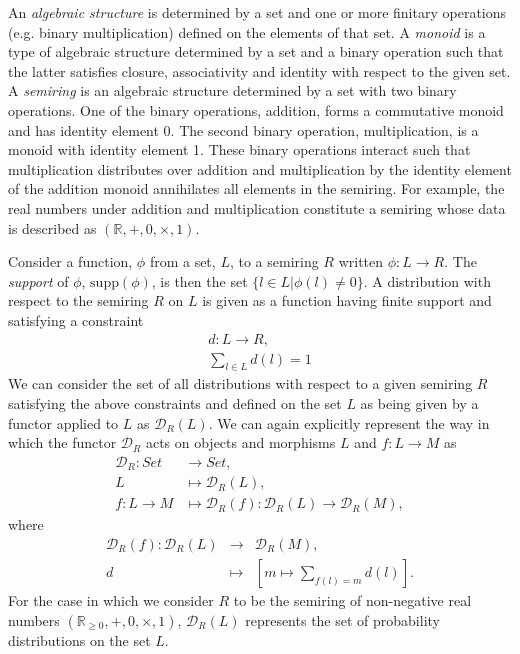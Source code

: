 An \emph{algebraic structure} is determined by a set and one or more finitary operations (e.g. binary multiplication) defined on the elements of that set. A \emph{monoid} is a type of algebraic structure determined by a set and a binary operation such that the latter satisfies closure, associativity and identity with respect to the given set. A \emph{semiring} is an algebraic structure determined by a set with two binary operations. One of the binary operations, addition, forms a commutative monoid and has identity element 0. The second binary operation, multiplication, is a monoid with identity element 1. These binary operations interact such that multiplication distributes over addition and multiplication by the identity element of the addition monoid annihilates all elements in the semiring. For example, the real numbers under addition and multiplication constitute a semiring whose data is described as $\left( \mathbb{R},+,0,\times,1 \right)$.

Consider a function, $\phi$ from a set, $L$, to a semiring $R$ written $\phi \colon L \rightarrow R$. The \emph{support} of $\phi$, $\text{supp}(\phi)$, is then the set $\{ l \in L | \phi(l) \neq 0 \}$. A distribution with respect to the semiring $R$ on $L$ is given as a function having finite support and satisfying a constraint
\begin{eqnarray*}
d \colon L \rightarrow R,\\
\sum_{l \in L} d(l) = 1
\end{eqnarray*}
We can consider the set of all distributions with respect to a given semiring $R$ satisfying the above constraints and defined on the set $L$ as being given by a functor applied to $L$ as $\mathcal{D}_R (L)$. We can again explicitly represent the way in which the functor $\mathcal{D}_R$ acts on objects and morphisms $L$ and $f \colon L \rightarrow M$ as
\begin{equation}\label{eq:distfunctor}
\begin{split}
\mathcal{D}_R \colon Set &\rightarrow Set,\\
L &\mapsto \mathcal{D}_R (L),\\
f \colon L \rightarrow M &\mapsto \mathcal{D}_R (f) \colon \mathcal{D}_R (L) \rightarrow \mathcal{D}_R (M),
\end{split}
\end{equation}
where
\begin{eqnarray*}
\mathcal{D}_R (f) \colon \mathcal{D}_R (L) &\rightarrow& \mathcal{D}_R (M),\\
d &\mapsto& \left[ m \mapsto \sum_{f(l)=m} d(l) \right].
\end{eqnarray*}
For the case in which we consider $R$ to be the semiring of non-negative real numbers $\left( \mathbb{R}_{\geq 0},+,0,\times,1 \right)$, $\mathcal{D}_R (L)$ represents the set of probability distributions on the set $L$.

